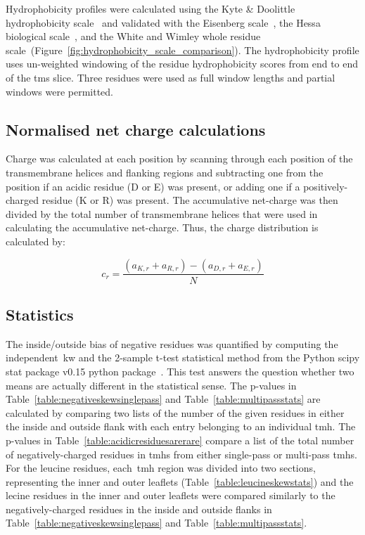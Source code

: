 Hydrophobicity profiles were calculated using the Kyte \& Doolittle hydrophobicity scale~\cite{Kyte1982} and validated with the Eisenberg scale~\cite{Eisenberg1984}, the Hessa biological scale~\cite{Hessa2005}, and the White and Wimley whole residue scale~\cite{White1999}(Figure~\ref{fig:hydrophobicity_scale_comparison}).
The hydrophobicity profile uses un-weighted windowing of the residue hydrophobicity scores from end to end of the \gls{tms} slice.
Three residues were used as full window lengths and partial windows were permitted.

\subsection{Normalised net charge calculations}

Charge was calculated at each position by scanning through each position of the transmembrane helices and flanking regions and subtracting one from the position if an acidic residue (D or E) was present, or adding one if a positively\--charged residue (K or R) was present.
The accumulative net-charge  was then divided by the total number  of transmembrane helices that were used in calculating the accumulative net-charge.
Thus, the charge distribution is calculated by:

\begin{equation} \label{eq:charge_equation}
c_r=\frac{(a_{K,r}+a_{R,r})-(a_{D,r}+a_{E,r})}{N}
\end{equation}

\subsection{Statistics}

The inside/outside bias of negative residues was quantified by computing the independent~\gls{kw} and the 2-sample t-test statistical method from the Python scipy stat package v0.15 python package~\cite{VanderWalt2011}.
This test answers the question whether two means are actually different in the statistical sense.
The p\--values in Table~\ref{table:negativeskewsinglepass} and Table~\ref{table:multipassstats} are calculated by comparing two lists of the number of the given residues in either the inside and outside flank with each entry belonging to an individual \gls{tmh}.
The p\--values in Table~\ref{table:acidicresiduesarerare} compare a list of the total number of negatively\--charged residues in \gls{tmh}s from either single\--pass or multi\--pass \gls{tmh}s.
For the leucine residues, each~\gls{tmh} region was divided into two sections, representing the inner and outer leaflets (Table~\ref{table:leucineskewstats}) and the lecine residues in the inner and outer leaflets were compared similarly to the negatively\--charged residues in the inside and outside flanks in Table~\ref{table:negativeskewsinglepass} and Table~\ref{table:multipassstats}.

